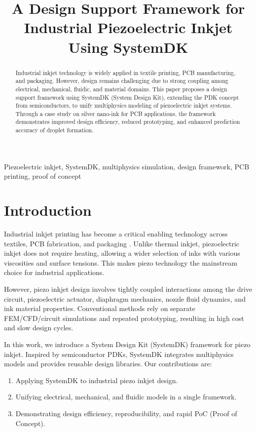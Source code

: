 \documentclass[conference]{IEEEtran}
\title{A Design Support Framework for Industrial Piezoelectric Inkjet Using SystemDK}
\author{%
  \IEEEauthorblockN{Shinichi Samizo}
  \IEEEauthorblockA{Independent Semiconductor Researcher\\
  Former Engineer at Seiko Epson Corporation\\
  Email: \href{mailto:shin3t72@gmail.com}{shin3t72@gmail.com}\\
  GitHub: \url{https://github.com/Samizo-AITL}}%
}
\begin{document}
\maketitle

\begin{abstract}
Industrial inkjet technology is widely applied in textile printing, PCB manufacturing, and packaging. 
However, design remains challenging due to strong coupling among electrical, mechanical, fluidic, and material domains. 
This paper proposes a design support framework using SystemDK (System Design Kit), extending the PDK concept from semiconductors, to unify multiphysics modeling of piezoelectric inkjet systems. 
Through a case study on silver nano-ink for PCB applications, the framework demonstrates improved design efficiency, reduced prototyping, and enhanced prediction accuracy of droplet formation.
\end{abstract}

\begin{IEEEkeywords}
Piezoelectric inkjet, SystemDK, multiphysics simulation, design framework, PCB printing, proof of concept
\end{IEEEkeywords}

\section{Introduction}
Industrial inkjet printing has become a critical enabling technology across textiles, PCB fabrication, and packaging \cite{derby2010,calvert2001}. 
Unlike thermal inkjet, piezoelectric inkjet does not require heating, allowing a wider selection of inks with various viscosities and surface tensions. 
This makes piezo technology the mainstream choice for industrial applications. 

However, piezo inkjet design involves tightly coupled interactions among the drive circuit, piezoelectric actuator, diaphragm mechanics, nozzle fluid dynamics, and ink material properties. 
Conventional methods rely on separate FEM/CFD/circuit simulations and repeated prototyping, resulting in high cost and slow design cycles.

In this work, we introduce a System Design Kit (SystemDK) framework for piezo inkjet. 
Inspired by semiconductor PDKs, SystemDK integrates multiphysics models and provides reusable design libraries. 
Our contributions are:
\begin{enumerate}
  \item Applying SystemDK to industrial piezo inkjet design.
  \item Unifying electrical, mechanical, and fluidic models in a single framework.
  \item Demonstrating design efficiency, reproducibility, and rapid PoC (Proof of Concept).
\end{enumerate}
\end{document}

